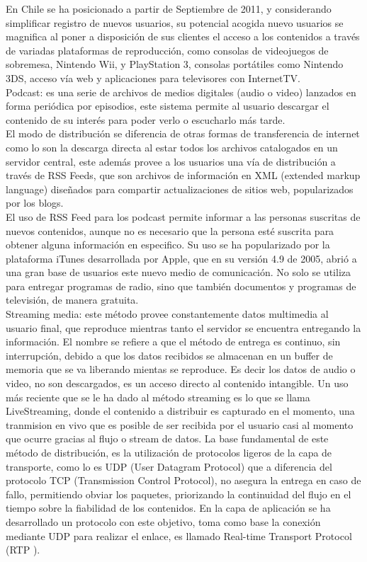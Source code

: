 En Chile se ha posicionado a partir de Septiembre de 2011, y considerando simplificar registro de nuevos usuarios, su potencial acogida nuevo usuarios se magnifica al poner a disposición de sus clientes el acceso a los contenidos a través de variadas plataformas de reproducción, como consolas de videojuegos de sobremesa, Nintendo Wii, y PlayStation 3, consolas portátiles como Nintendo 3DS, acceso vía web y aplicaciones para televisores con InternetTV. \\

Podcast: es una serie de archivos de medios digitales (audio o video) lanzados en forma periódica por episodios, este sistema permite al usuario descargar el contenido de su interés para poder verlo o escucharlo más tarde.\\

El modo de distribución se diferencia de otras formas de transferencia de internet como lo son la descarga directa al estar todos los archivos catalogados en un servidor central, este además provee a los usuarios una vía de distribución a través de RSS Feeds, que son archivos de información en XML (extended markup language) diseñados para compartir actualizaciones de sitios web, popularizados por los blogs.\\ 
El uso de RSS Feed para los podcast permite informar a las personas suscritas de nuevos contenidos, aunque no es necesario que la persona esté suscrita para obtener alguna información en especifico. 
Su uso se ha popularizado por la plataforma iTunes desarrollada por Apple, que en su versión 4.9 de 2005, abrió a una gran base de usuarios este nuevo medio de comunicación. No solo se utiliza para entregar programas de radio, sino que también documentos y programas de televisión, de manera gratuita.\\

Streaming media: este método provee constantemente datos multimedia al usuario final, que reproduce mientras tanto el servidor se encuentra entregando la información.
El nombre se refiere a que el método de entrega es continuo, sin interrupción, debido a que los datos recibidos se almacenan en un buffer de memoria que se va liberando mientas se reproduce. Es decir los datos de audio o video, no son descargados,  es un acceso directo al contenido intangible.
Un uso más reciente que se le ha dado al método streaming es lo que se llama LiveStreaming, donde el contenido a distribuir es capturado en el momento, una tranmision en vivo que es posible de ser recibida por el usuario casi al momento que ocurre gracias al flujo o stream de datos.
La base fundamental de este método de distribución, es la utilización de protocolos ligeros de la capa de transporte, como lo es UDP (User Datagram Protocol) que a diferencia del protocolo TCP (Transmission Control Protocol), no asegura la entrega en caso de fallo, permitiendo obviar los paquetes, priorizando la continuidad del flujo en el tiempo sobre la fiabilidad de los contenidos.  En la capa de aplicación se ha desarrollado un protocolo con este objetivo, toma como base la conexión mediante UDP para realizar el enlace, es llamado Real-time Transport Protocol (RTP \cite{sota:rtp-draft}).\\

